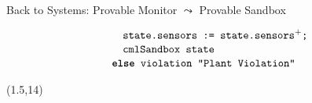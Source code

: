 \documentclass[slidestop,aspectratio=169]{beamer}
\newcommand{\textbt}[1]{{\text{\ttfamily\fontseries{b}\selectfont #1}}}
\newcommand{\short}{\\[-0.03in]}
\theoremstyle{plain}
\theoremstyle{definition}
\theoremstyle{remark}
\begin{document}
\begin{frame}[t]{Back to Systems: Provable Monitor $\leadsto$ Provable Sandbox}
\begin{textblock}{10}
{\begin{align*}
&\quad\quad\texttt{state.sensors := state.sensors}^+\texttt{;} \short
&\quad\quad\texttt{cmlSandbox state} \short
&\quad\textbt{else}\texttt{ violation "Plant Violation"}
\end{align*}}
\end{textblock}
\begin{textblock}{20}(1.5,14)
\end{textblock}

\end{frame}
\end{document}
